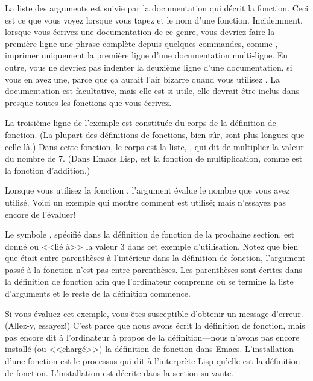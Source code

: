 La liste des arguments est suivie par la documentation qui décrit la
fonction. Ceci est ce que vous voyez lorsque vous tapez  et
le nom d'une fonction. Incidemment, lorsque vous écrivez une
documentation de ce genre, vous devriez faire la première ligne une
phrase complète depuis quelques commandes, comme ,
imprimer uniquement la première ligne d'une documentation
multi-ligne. En outre, vous ne devriez pas indenter la deuxième ligne
d'une documentation, si vous en avez une, parce que ça aurait l'air
bizarre quand vous utilisez . La
documentation est facultative, mais elle est si utile, elle devrait
être inclus dans presque toutes les fonctions que vous écrivez.

La troisième ligne de l'exemple est constituée du corps de la
définition de fonction. (La plupart des définitions de fonctions, bien
sûr, sont plus longues que celle-là.) Dans cette fonction, le corps
est la liste, , qui dit de multiplier la valeur du
nombre de 7. (Dans Emacs Lisp, \tm{*} est la fonction de
multiplication, comme \tm{+} est la fonction d'addition.)

Lorsque vous utilisez la fonction , l'argument
 évalue le nombre que vous avez utilisé. Voici un exemple
qui montre comment  est utilisé; mais n'essayez
pas encore de l'évaluer!


Le symbole , spécifié dans la définition de fonction de la
prochaine section, est donné ou <<lié à>> la valeur 3 dans cet exemple
d'utilisation. Notez que bien que  était entre parenthèses
à l'intérieur dans la définition de fonction, l'argument passé à la
fonction  n'est pas entre parenthèses. Les
parenthèses sont écrites dans la définition de fonction afin que
l'ordinateur comprenne où se termine la liste d'arguments et le reste
de la définition commence. 

Si vous évaluez cet exemple, vous êtes susceptible d'obtenir un
message d'erreur. (Allez-y, essayez!) C'est parce que nous avons écrit
la définition de fonction, mais pas encore dit à l'ordinateur à propos
de la définition---nous n'avons pas encore installé (ou <<chargé>>) la
définition de fonction dans Emacs. L'installation d'une fonction est
le processus qui dit à l'interprète Lisp qu'elle est la définition de
fonction. L'installation est décrite dans la section suivante. 